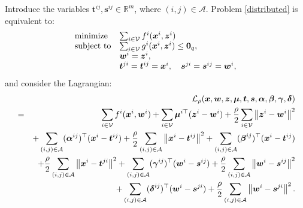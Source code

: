 \documentclass[11pt,a4paper]{article}
\theoremstyle{plain}
\theoremstyle{definition}
\theoremstyle{remark}
\begin{document}
	Introduce the variables $\boldsymbol{t}%
	^{ij}, \boldsymbol{s}^{ij} \in \mathbb{R}^m $, where $(i, j) \in \mathcal{A} 
	$. Problem \eqref{distributed} is equivalent to:
	\begin{equation}
		\begin{array}{ll}
			\text{minimize} & \sum_{i \in \mathcal{V}} f^i(\boldsymbol{x}^i, \boldsymbol{%
				z}^i) \\ 
			\text{subject to} & \sum_{i \in \mathcal{V}} g^i(\boldsymbol{x}^i, 
			\boldsymbol{z}^i) \leq \boldsymbol{0}_q, \\ 
			& \boldsymbol{w}^i = \boldsymbol{z}^i, \\ 
			& \boldsymbol{t}^{ji} = \boldsymbol{t}^{ij} = \boldsymbol{x}^i, \quad 
			\boldsymbol{s}^{ji} = \boldsymbol{s}^{ij} = \boldsymbol{w}^i,
		\end{array}%
	\end{equation}
	and consider the Lagrangian:
	\begin{eqnarray*}
		&&\mathcal{L}_{\rho }(\boldsymbol{x},\boldsymbol{w},\boldsymbol{z},%
		\boldsymbol{\mu },\boldsymbol{t},\boldsymbol{s},\boldsymbol{\alpha },%
		\boldsymbol{\beta },\boldsymbol{\gamma },\boldsymbol{\delta }) \\
		&=&\sum_{i\in \mathcal{V}}f^{i}(\boldsymbol{x}^{i},\boldsymbol{w}%
		^{i})+\sum_{i\in \mathcal{V}}\boldsymbol{\mu }^{i\top }(\boldsymbol{z}^{i}-%
		\boldsymbol{w}^{i})+\frac{\rho }{2}\sum_{i\in \mathcal{V}}\left\Vert 
		\boldsymbol{z}^{i}-\boldsymbol{w}^{i}\right\Vert ^{2} \\
		&&+\sum_{(i,j)\in \mathcal{A}}(\boldsymbol{\alpha }^{ij})^{\top }(%
		\boldsymbol{x}^{i}-\boldsymbol{t}^{ij})+\frac{\rho }{2}\sum_{(i,j)\in 
			\mathcal{A}}\left\Vert \boldsymbol{x}^{i}-\boldsymbol{t}^{ij}\right\Vert^{2}+\sum_{(i,j)\in \mathcal{A}}(\boldsymbol{\beta }%
		^{ij})^{\top }(\boldsymbol{x}^{i}-\boldsymbol{t}^{ij}) \\
		&&+\frac{\rho }{2}\sum_{(i,j)\in \mathcal{A}}\left\Vert \boldsymbol{x}^{i}-%
		\boldsymbol{t}^{ji}\right\Vert ^{2}+\sum_{(i,j)\in \mathcal{%
				A}}(\boldsymbol{\gamma }^{ij})^{\top }(\boldsymbol{w}^{i}-\boldsymbol{s}%
		^{ij})+\frac{\rho }{2}\sum_{(i,j)\in \mathcal{A}}\left\Vert \boldsymbol{w}%
		^{i}-\boldsymbol{s}^{ij}\right\Vert ^{2} \\
		&&+\sum_{(i,j)\in \mathcal{A}}(\boldsymbol{\delta }^{ij})^{\top }(%
		\boldsymbol{w}^{i}-\boldsymbol{s}^{ji})+\frac{\rho }{2}\sum_{(i,j)\in 
			\mathcal{A}}\left\Vert \boldsymbol{w}^{i}-\boldsymbol{s}^{ji}\right\Vert ^{2}.
	\end{eqnarray*}	
\end{document}
